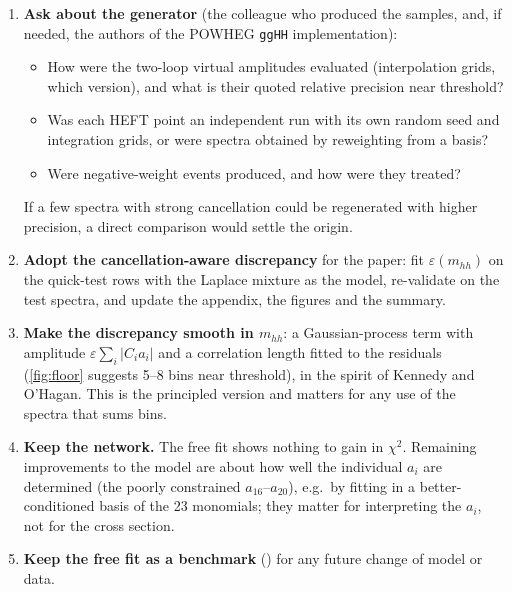 \begin{enumerate}
  \item \textbf{Ask about the generator} (the colleague who produced the samples, and, if
    needed, the authors of the POWHEG \texttt{ggHH} implementation):
    \begin{itemize}
      \item How were the two-loop virtual amplitudes evaluated (interpolation grids, which
        version), and what is their quoted relative precision near threshold?
      \item Was each HEFT point an independent run with its own random seed and integration
        grids, or were spectra obtained by reweighting from a basis?
      \item Were negative-weight events produced, and how were they treated?
    \end{itemize}
    If a few spectra with strong cancellation could be regenerated with higher precision,
    a direct comparison would settle the origin.
  \item \textbf{Adopt the cancellation-aware discrepancy} for the paper: fit $\varepsilon(m_{hh})$
    on the quick-test rows with the Laplace mixture as the model, re-validate on the test
    spectra, and update the appendix, the figures and the summary.
  \item \textbf{Make the discrepancy smooth in $m_{hh}$}: a Gaussian-process term with
    amplitude $\varepsilon\sum_i|C_ia_i|$ and a correlation length fitted to the residuals
    (\cref{fig:floor} suggests 5--8 bins near threshold), in the spirit of Kennedy and O'Hagan.
    This is the principled version and matters for any use of the spectra that sums bins.
  \item \textbf{Keep the network.} The free fit shows nothing to gain in $\chi^2$. Remaining
    improvements to the model are about how well the individual $a_i$ are determined (the
    poorly constrained $a_{16}$--$a_{20}$), e.g.\ by fitting in a better-conditioned basis of
    the 23 monomials; they matter for interpreting the $a_i$, not for the cross section.
  \item \textbf{Keep the free fit as a benchmark} () for any future
    change of model or data.
\end{enumerate}


